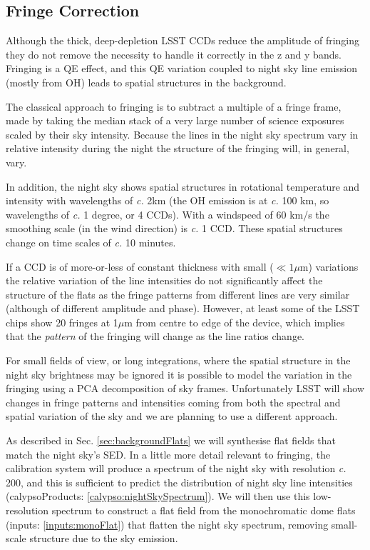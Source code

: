 \documentclass[12pt]{article}
\renewcommand{\c}{\textit{c.}\xspace}
\newcommand{\inputData}[1]{(inputs: \ref{inputs:#1})}
\newcommand{\calypsoData}[1]{(calypsoProducts: \ref{calypso:#1})}
\newcommand{\secRef}[1]{Sec. \ref{sec:#1}}
\begin{document}
\subsection{Fringe Correction}
\label{sec:fringe}

Although the thick, deep-depletion LSST CCDs reduce the amplitude of fringing they do not remove the necessity
to handle it correctly in the z and y bands.  Fringing is a QE effect, and this QE variation coupled to night
sky line emission (mostly from OH) leads to spatial structures in the background.

The classical approach to fringing is to subtract a multiple of a fringe frame, made by taking the median
stack of a very large number of science exposures scaled by their sky intensity.  Because the lines in the
night sky spectrum vary in relative intensity during the night the structure of the
fringing will, in general, vary.

In addition, the night sky shows spatial structures in rotational temperature and intensity with wavelengths
of \c 2km (the OH emission is at \c 100 km, so wavelengths of \c 1 degree, or 4 CCDs).  With a
windspeed of 60 km/s the smoothing scale (in the wind direction) is \c 1 CCD.  These spatial structures change
on time scales of \c 10 minutes.

If a CCD is of more-or-less of constant thickness with small ($\ll 1\mu$m) variations the relative variation
of the line intensities do not significantly affect the structure of the flats as the fringe patterns from
different lines are very similar (although of different amplitude and phase).  However, at least some of the
LSST chips show 20 fringes at 1$\mu$m from centre to edge of the device, which implies that the
\textit{pattern} of the fringing will change as the line ratios change.

For small fields of view, or long integrations, where the spatial structure in the night sky brightness may be
ignored it is possible to model the variation in the fringing using a PCA decomposition of sky frames.
Unfortunately LSST will show changes in fringe patterns and intensities coming from both the spectral and
spatial variation of the sky and we are planning to use a different approach.

As described in \secRef{backgroundFlats} we will synthesise flat fields that match the night sky's SED.  In a
little more detail relevant to fringing, the calibration system will produce a spectrum of the night sky with
resolution \c 200, and this is sufficient to predict the distribution of night sky line intensities
\calypsoData{nightSkySpectrum}.  We will then use this low-resolution spectrum to construct a flat field from
the monochromatic dome flats \inputData{monoFlat} that flatten the night sky spectrum, removing small-scale
structure due to the sky emission.
\end{document}
